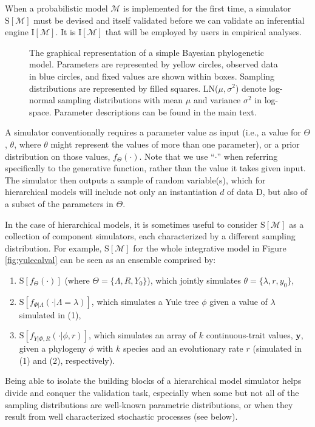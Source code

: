 \documentclass[oneside]{article}
\begin{document}
When a probabilistic model $\mathcal{M}$ is implemented for the first time, a simulator $\text{S}[\mathcal{M}]$ must be devised and itself validated before we can validate an inferential engine $\text{I}[\mathcal{M}]$.
It is $\text{I}[\mathcal{M}]$ that will be employed by users in empirical analyses.
\begin{figure}
      
  \caption{The graphical representation of a simple Bayesian
    phylogenetic model.
    Parameters are represented by yellow circles, observed data
    in blue circles, and fixed values are shown within boxes.
    Sampling distributions are represented by filled squares.
    LN($\mu,\sigma^2$) denote log-normal sampling distributions
    with mean $\mu$ and variance $\sigma^2$ in log-space.
    Parameter descriptions can be found in the main text.
    }
  \label{fig:pgm}
\end{figure}
A simulator conventionally requires a parameter value as input (i.e., a value for $\Theta$, $\theta$, where $\theta$ might represent the values of more than one parameter), or a prior distribution on those values, $f_\Theta(\cdot)$. 
Note that we use ``$\cdot$'' when referring specifically to the generative function, rather than the value it takes given input.
The simulator then outputs a sample of random variable(s), which for hierarchical models will include not only an instantiation $d$ of data $\text{D}$, but also of a subset of the parameters in $\Theta$.
 
In the case of hierarchical models, it is sometimes useful to consider $\text{S}[\mathcal{M}]$ as a collection of component simulators, each characterized by a different sampling distribution.
For example, $\text{S}[\mathcal{M}]$ for the whole integrative model in Figure \ref{fig:yulecalval} can be seen as an ensemble comprised by:
\begin{enumerate}
  \item $\text{S}[f_\Theta(\cdot)]$ (where $\Theta = \{\Lambda, R, Y_0\}$), which jointly simulates $\theta=\{\lambda,r,y_0\}$,
  \item $\text{S}[f_{\Phi|\Lambda}(\cdot|\Lambda=\lambda)]$, which simulates a Yule tree $\phi$ given a value of $\lambda$ simulated in (1),
  \item $\text{S}[f_{Y|\Phi,R}(\cdot|\phi,r)]$, which simulates an array of $k$ continuous-trait values, $\boldsymbol{y}$, given a phylogeny $\phi$ with $k$ species and an evolutionary rate $r$ (simulated in (1) and (2), respectively).
\end{enumerate}
Being able to isolate the building blocks of a hierarchical model simulator helps divide and conquer the validation task, especially when some but not all of the sampling distributions are well-known parametric distributions, or when they result from well characterized stochastic processes (see below).
\end{document}

